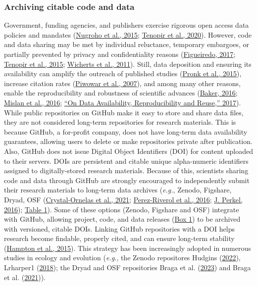 \hypertarget{archiving-citable-code}{%
\subsubsection{Archiving citable code and data}\label{archiving-citable-code}}

Government, funding agencies, and publishers exercise rigorous open access data policies and mandates (\protect\hyperlink{ref-1Hcf13Q0k}{Nugroho et al., 2015}; \protect\hyperlink{ref-PLmDFZrm}{Tenopir et al., 2020}).
However, code and data sharing may be met by individual reluctance, temporary embargoes, or partially prevented by privacy and confidentiality reasons (\protect\hyperlink{ref-SLq38RVv}{Figueiredo, 2017}; \protect\hyperlink{ref-1CzUZwyU2}{Tenopir et al., 2015}; \protect\hyperlink{ref-1Ch6LSHef}{Wicherts et al., 2011}).
Still, data deposition and ensuring its availability can amplify the outreach of published studies (\protect\hyperlink{ref-666HppfO}{Pronk et al., 2015}), increase citation rates (\protect\hyperlink{ref-1CcAUn3Lu}{Piwowar et al., 2007}), and among many other reasons, enable the reproducibility and robustness of scientific advances (\protect\hyperlink{ref-1HZdsK5Kn}{Baker, 2016}; \protect\hyperlink{ref-uBJwnPbq}{Mislan et al., 2016}; \protect\hyperlink{ref-4LaijDIZ}{{``On Data Availability, Reproducibility and Reuse,''} 2017}).
While public repositories on GitHub make it easy to store and share data files, they are not considered long-term repositories for research materials.
This is because GitHub, a for-profit company, does not have long-term data availability guarantees, allowing users to delete or make repositories private after publication.
Also, GitHub does not issue Digital Object Identifiers (DOI) for content uploaded to their servers.
DOIs are persistent and citable unique alpha-numeric identifiers assigned to digitally-stored research materials.
Because of this, scientists sharing code and data through GitHub are strongly encouraged to independently submit their research materials to long-term data archives (\emph{e.g.}, Zenodo, Figshare, Dryad, OSF (\protect\hyperlink{ref-1Du6fzB8g}{Crystal‐Ornelas et al., 2021}; \protect\hyperlink{ref-kEX5dgzK}{Perez-Riverol et al., 2016}; \protect\hyperlink{ref-10ghgV3S8}{J. Perkel, 2016}); \protect\hyperlink{tbl:compare}{Table 1}).
Some of these options (Zenodo, Figshare and OSF) integrate with GitHub, allowing project, code, and data releases (\protect\hyperlink{definitions}{Box 1}) to be archived with versioned, citable DOIs.
Linking GitHub repositories with a DOI helps research become findable, properly cited, and can ensure long-term stability (\protect\hyperlink{ref-iIEKCTLU}{Hampton et al., 2015}).
This strategy has been increasingly adopted in numerous studies in ecology and evolution (\emph{e.g.}, the Zenodo repositores Hudgins (\protect\hyperlink{ref-GQj3c17f}{2022}), Lrharper1 (\protect\hyperlink{ref-ZI1OqZNr}{2018}); the Dryad and OSF repositories Braga et al. (\protect\hyperlink{ref-xbM3u93u}{2023}) and Braga et al. (\protect\hyperlink{ref-TpcnPdJo}{2021})).

